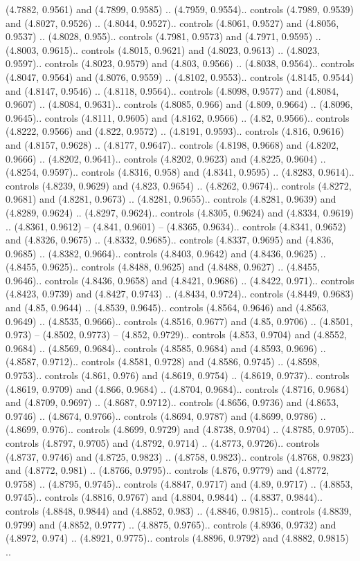 (4.7882, 0.9561) and (4.7899, 0.9585) .. (4.7959, 0.9554).. controls (4.7989, 0.9539) and (4.8027, 0.9526) .. (4.8044, 0.9527).. controls (4.8061, 0.9527) and (4.8056, 0.9537) .. (4.8028, 0.955).. controls (4.7981, 0.9573) and (4.7971, 0.9595) .. (4.8003, 0.9615).. controls (4.8015, 0.9621) and (4.8023, 0.9613) .. (4.8023, 0.9597).. controls (4.8023, 0.9579) and (4.803, 0.9566) .. (4.8038, 0.9564).. controls (4.8047, 0.9564) and (4.8076, 0.9559) .. (4.8102, 0.9553).. controls (4.8145, 0.9544) and (4.8147, 0.9546) .. (4.8118, 0.9564).. controls (4.8098, 0.9577) and (4.8084, 0.9607) .. (4.8084, 0.9631).. controls (4.8085, 0.966) and (4.809, 0.9664) .. (4.8096, 0.9645).. controls (4.8111, 0.9605) and (4.8162, 0.9566) .. (4.82, 0.9566).. controls (4.8222, 0.9566) and (4.822, 0.9572) .. (4.8191, 0.9593).. controls (4.816, 0.9616) and (4.8157, 0.9628) .. (4.8177, 0.9647).. controls (4.8198, 0.9668) and (4.8202, 0.9666) .. (4.8202, 0.9641).. controls (4.8202, 0.9623) and (4.8225, 0.9604) .. (4.8254, 0.9597).. controls (4.8316, 0.958) and (4.8341, 0.9595) .. (4.8283, 0.9614).. controls (4.8239, 0.9629) and (4.823, 0.9654) .. (4.8262, 0.9674).. controls (4.8272, 0.9681) and (4.8281, 0.9673) .. (4.8281, 0.9655).. controls (4.8281, 0.9639) and (4.8289, 0.9624) .. (4.8297, 0.9624).. controls (4.8305, 0.9624) and (4.8334, 0.9619) .. (4.8361, 0.9612) -- (4.841, 0.9601) -- (4.8365, 0.9634).. controls (4.8341, 0.9652) and (4.8326, 0.9675) .. (4.8332, 0.9685).. controls (4.8337, 0.9695) and (4.836, 0.9685) .. (4.8382, 0.9664).. controls (4.8403, 0.9642) and (4.8436, 0.9625) .. (4.8455, 0.9625).. controls (4.8488, 0.9625) and (4.8488, 0.9627) .. (4.8455, 0.9646).. controls (4.8436, 0.9658) and (4.8421, 0.9686) .. (4.8422, 0.971).. controls (4.8423, 0.9739) and (4.8427, 0.9743) .. (4.8434, 0.9724).. controls (4.8449, 0.9683) and (4.85, 0.9644) .. (4.8539, 0.9645).. controls (4.8564, 0.9646) and (4.8563, 0.9649) .. (4.8535, 0.9666).. controls (4.8516, 0.9677) and (4.85, 0.9706) .. (4.8501, 0.973) -- (4.8502, 0.9773) -- (4.852, 0.9729).. controls (4.853, 0.9704) and (4.8552, 0.9684) .. (4.8569, 0.9684).. controls (4.8585, 0.9684) and (4.8593, 0.9696) .. (4.8587, 0.9712).. controls (4.8581, 0.9728) and (4.8586, 0.9745) .. (4.8598, 0.9753).. controls (4.861, 0.976) and (4.8619, 0.9754) .. (4.8619, 0.9737).. controls (4.8619, 0.9709) and (4.866, 0.9684) .. (4.8704, 0.9684).. controls (4.8716, 0.9684) and (4.8709, 0.9697) .. (4.8687, 0.9712).. controls (4.8656, 0.9736) and (4.8653, 0.9746) .. (4.8674, 0.9766).. controls (4.8694, 0.9787) and (4.8699, 0.9786) .. (4.8699, 0.976).. controls (4.8699, 0.9729) and (4.8738, 0.9704) .. (4.8785, 0.9705).. controls (4.8797, 0.9705) and (4.8792, 0.9714) .. (4.8773, 0.9726).. controls (4.8737, 0.9746) and (4.8725, 0.9823) .. (4.8758, 0.9823).. controls (4.8768, 0.9823) and (4.8772, 0.981) .. (4.8766, 0.9795).. controls (4.876, 0.9779) and (4.8772, 0.9758) .. (4.8795, 0.9745).. controls (4.8847, 0.9717) and (4.89, 0.9717) .. (4.8853, 0.9745).. controls (4.8816, 0.9767) and (4.8804, 0.9844) .. (4.8837, 0.9844).. controls (4.8848, 0.9844) and (4.8852, 0.983) .. (4.8846, 0.9815).. controls (4.8839, 0.9799) and (4.8852, 0.9777) .. (4.8875, 0.9765).. controls (4.8936, 0.9732) and (4.8972, 0.974) .. (4.8921, 0.9775).. controls (4.8896, 0.9792) and (4.8882, 0.9815) .. 